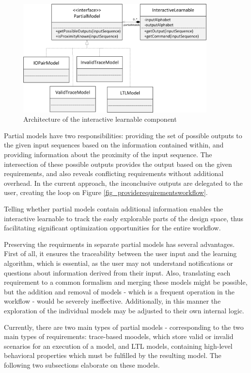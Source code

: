 \begin{figure}[!ht] 
	\centering
	\includegraphics[width=100mm, keepaspectratio]{figures/architecture_interactivelearnable.png}
	\caption{Architecture of the interactive learnable component} 
	\label{fig_architcture_interactivelearnable}
\end{figure}

Partial models have two responsibilities: providing the set of possible outputs to the given input sequences based on the information contained within, and providing information about the proximity of the input sequence. The intersection of these possible outputs provides the output based on the given requirements, and also reveals conflicting requirements without additional overhead. In the current approach, the inconclusive outputs are delegated to the user, creating the loop on Figure \ref{fig_providerequirementsworkflow}.

Telling whether partial models contain additional information enables the interactive learnable to track the easly explorable parts of the design space, thus facilitating significant optimization opportunities for the entire workflow.

Preserving the requirments in separate partial models has several advantages. First of all, it ensures the traceability between the user input and the learning algorithm, which is essential, as the user may not understand notifications or questions about information derived from their input. Also, translating each requirement to a common formalism and merging these models might be possible, but the addition and removal of models - which is a frequent operation in the workflow - would be severely ineffective. Additionally, in this manner the exploration of the individual models may be adjusted to their own internal logic.

Currently, there are two main types of partial models - corresponding to the two main types of requirements: trace-based moodels, which store valid or invalid scenarios for an execution of a model, and LTL models, containing high-level behavioral properties which must be fulfilled by the resulting model. The following two subsections elaborate on these models. 

